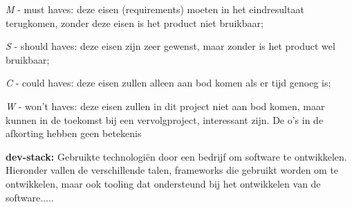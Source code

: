 \textit{M} - must haves: deze eisen (requirements) moeten in het eindresultaat terugkomen, zonder deze eisen is het product niet bruikbaar;

\textit{S} - should haves: deze eisen zijn zeer gewenst, maar zonder is het product wel bruikbaar;

\textit{C} - could haves: deze eisen zullen alleen aan bod komen als er tijd genoeg is;

\textit{W} - won't haves: deze eisen zullen in dit project niet aan bod komen, maar kunnen in de toekomst bij een vervolgproject, interessant zijn.
De o's in de afkorting hebben geen betekenis
\smallskip

\textbf{dev-stack: }
Gebruikte technologiën door een bedrijf om software te ontwikkelen.
Hieronder vallen de verschillende talen, frameworks die gebruikt worden om te ontwikkelen, maar ook tooling dat ondersteund bij het ontwikkelen van de software.....
